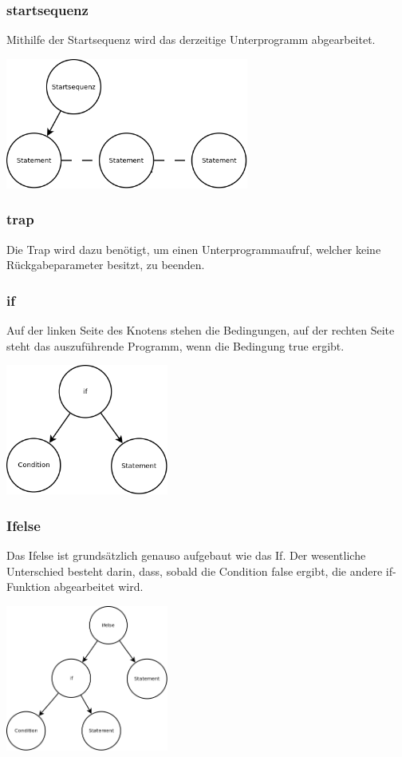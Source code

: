 \subsubsection{startsequenz}
Mithilfe der Startsequenz wird das derzeitige Unterprogramm abgearbeitet.

\includegraphics[width=0.6\textwidth]{./media/images/interpreter/syntaxbaum/statements/startsequenz.png}

\subsubsection{trap}
Die Trap wird dazu benötigt, um einen Unterprogrammaufruf, welcher keine Rückgabeparameter besitzt, zu beenden.

\subsubsection{if}
Auf der linken Seite des Knotens stehen die Bedingungen, auf der rechten Seite steht das auszuführende Programm, wenn die Bedingung
true ergibt.

\includegraphics[width=0.4\textwidth]{./media/images/interpreter/syntaxbaum/statements/if.png}

\subsubsection{Ifelse}
Das Ifelse ist grundsätzlich genauso aufgebaut wie das If. Der wesentliche Unterschied besteht darin, dass, sobald die Condition
false ergibt, die andere if-Funktion abgearbeitet wird.

\includegraphics[width=0.4\textwidth]{./media/images/interpreter/syntaxbaum/statements/ifelse.png}

